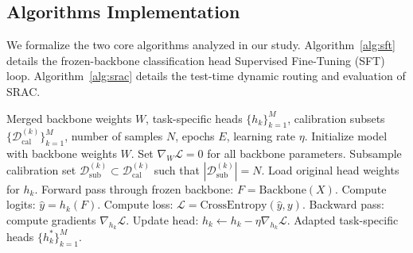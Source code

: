 \documentclass{article}
\theoremstyle{plain}
\theoremstyle{definition}
\theoremstyle{remark}
\begin{document}
\subsection{Algorithms Implementation}
We formalize the two core algorithms analyzed in our study. Algorithm~\ref{alg:sft} details the frozen-backbone classification head Supervised Fine-Tuning (SFT) loop. Algorithm~\ref{alg:srac} details the test-time dynamic routing and evaluation of SRAC.

\begin{algorithm}[tb]
\caption{Classification Head Supervised Fine-Tuning (SFT)}
\label{alg:sft}
\begin{algorithmic}[1]
 Merged backbone weights $W$, task-specific heads $\{h_k\}_{k=1}^{M}$, calibration subsets $\{\mathcal{D}_{\text{cal}}^{(k)}\}_{k=1}^{M}$, number of samples $N$, epochs $E$, learning rate $\eta$.
 Initialize model with backbone weights $W$.
 Set $\nabla_W \mathcal{L} = 0$ for all backbone parameters.
    \STATE Subsample calibration set $\mathcal{D}_{\text{sub}}^{(k)} \subset \mathcal{D}_{\text{cal}}^{(k)}$ such that $|\mathcal{D}_{\text{sub}}^{(k)}| = N$.
    \STATE Load original head weights for $h_k$.
            \STATE Forward pass through frozen backbone: $F = \text{Backbone}(X)$.
            \STATE Compute logits: $\hat{y} = h_k(F)$.
            \STATE Compute loss: $\mathcal{L} = \text{CrossEntropy}(\hat{y}, y)$.
            \STATE Backward pass: compute gradients $\nabla_{h_k} \mathcal{L}$.
            \STATE Update head: $h_k \leftarrow h_k - \eta \nabla_{h_k} \mathcal{L}$.
        \ENDFOR
    \ENDFOR
\ENDFOR
{} Adapted task-specific heads $\{h_k^*\}_{k=1}^{M}$.
\end{algorithmic}
\end{algorithm}
\end{document}

